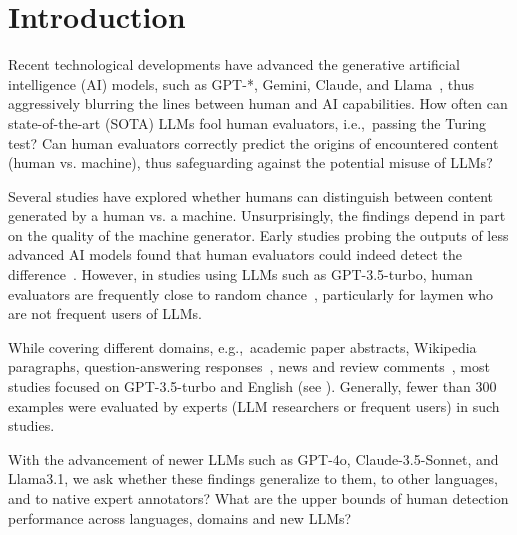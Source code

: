 \section{Introduction}
Recent technological developments have advanced the  generative artificial intelligence (AI) models, such as GPT-*, Gemini, Claude, and Llama~\cite{OpenAI2023GPT4TR, team2023gemini, Claude3, llama3}, thus aggressively blurring the lines between human and AI capabilities.
How often can state-of-the-art (SOTA) LLMs fool human evaluators, i.e.,~passing the Turing test? Can human evaluators correctly predict the origins of encountered content (human vs. machine), thus safeguarding against the potential misuse of LLMs? 

 
Several studies have explored whether humans can distinguish between content generated by a human vs. a machine. Unsurprisingly, the findings depend in part on the quality of the machine generator.
Early studies probing the outputs of less advanced AI models found that human evaluators could indeed detect the difference~\cite{van-der-lee-etal-2019-best}. 
However, in studies using LLMs such as GPT-3.5-turbo, human evaluators are frequently close to random chance~\cite{guo-etal-2023-hc3, jimpei2023creative, liam2023reakfake, chein2024human, wang2024m4gtbench}, particularly for laymen who are not frequent users of LLMs. 

While covering different domains, e.g.,~academic paper abstracts, Wikipedia paragraphs, question-answering responses~\cite{wang-etal-2024-m4, wang2024m4gtbench}, news and review comments~\cite{chein2024human}, most studies focused on GPT-3.5-turbo and English (see ). Generally, fewer than 300 examples were evaluated by experts (LLM researchers or frequent users) in such studies. 

With the advancement of newer LLMs such as GPT-4o, Claude-3.5-Sonnet, and Llama3.1, we ask whether these findings generalize to them, to other languages, and to native expert annotators? What are the upper bounds of human detection performance across languages, domains and new LLMs? %

